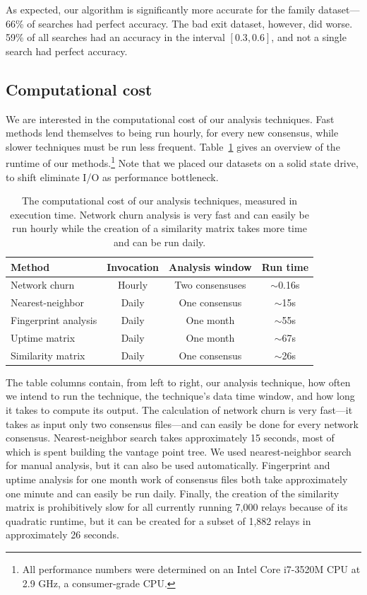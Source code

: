 As expected, our algorithm is significantly more accurate for the family
dataset---66\% of searches had perfect accuracy.  The bad exit dataset, however,
did worse.  59\% of all searches had an accuracy in the interval $[0.3,0.6]$,
and not a single search had perfect accuracy.

\subsection{Computational cost}
\label{sec:performance}
We are interested in the computational cost of our analysis techniques.  Fast
methods lend themselves to being run hourly, for every new consensus, while
slower techniques must be run less frequent.  Table~\ref{tab:exp-deployment}
gives an overview of the runtime of our methods.\footnote{All performance
numbers were determined on an Intel Core i7-3520M CPU at 2.9 GHz, a
consumer-grade CPU.}  Note that we
placed our datasets on a solid state drive, to shift eliminate I/O as
performance bottleneck.

\begin{table}[t]
	\centering
	\begin{tabular}{lccc}
	\textbf{Method} & \textbf{Invocation} & \textbf{Analysis window} & \textbf{Run time} \\
	\hline
	Network churn & Hourly & Two consensuses & $\sim$0.16s \\
	Nearest-neighbor & Daily & One consensus & $\sim$15s \\
	Fingerprint analysis & Daily & One month & $\sim$55s \\
	Uptime matrix & Daily & One month & $\sim$67s \\
	Similarity matrix & Daily & One consensus & $\sim$26s \\
	\end{tabular}
	\caption{The computational cost of our analysis techniques, measured in
	execution time.  Network churn analysis is very fast and can easily be run
	hourly while the creation of a similarity matrix takes more time and can be
	run daily.}
	\label{tab:exp-deployment}
\end{table}

The table columns contain, from left to right, our analysis technique, how often
we intend to run the technique, the technique's data time window, and how long
it takes to compute its output.  The calculation of network churn is very
fast---it takes as input only two consensus files---and can easily be done for
every network consensus.  Nearest-neighbor search takes approximately 15
seconds, most of which is spent building the vantage point tree.  We used
nearest-neighbor search for manual analysis, but it can also be used
automatically.  Fingerprint and uptime analysis for one month work of consensus
files both take approximately one minute and can easily be run daily.  Finally,
the creation of the similarity matrix is prohibitively slow for all currently
running 7,000 relays because of its quadratic runtime, but it can be created for
a subset of 1,882 relays in approximately 26 seconds.
